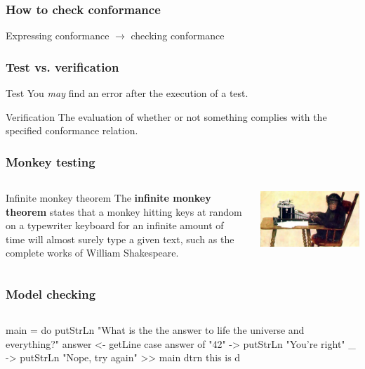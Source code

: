 \documentclass{beamer}
\begin{document}
\begin{frame}
\frametitle{How to check conformance}

\Large{Expressing conformance $\xrightarrow{\ }$ checking conformance}

\end{frame}

\begin{frame}
\frametitle{Test vs. verification}
\begin{block}{Test}
You \textit{may} find an error after the execution of a test.
\end{block}
\begin{block}{Verification}
The evaluation of whether or not something complies with the
specified conformance relation.
\end{block}
\end{frame}

\begin{frame}
\frametitle{Monkey testing}
    \begin{columns}[c] %
\begin{block}{Infinite monkey theorem}
The \textbf{infinite monkey theorem} states that a monkey hitting keys at random
on a typewriter keyboard for an infinite amount of time will almost surely type a
given text, such as the complete works of William Shakespeare.\cite{monkey}
\end{block}
    \includegraphics[width=\textwidth]{../img/monkey_approach} 
    \end{columns}
\end{frame}

\begin{frame}
\frametitle{Model checking}
    \begin{columns}[c] %
    main = do
    	putStrLn "What is the the answer to life the universe and everything?"
    	answer <- getLine
    	case answer of 
    	"42" -> putStrLn "You're right"
    		_	 -> putStrLn "Nope, try again" >> main 
    dtrn this is d
    \end{columns}
\end{frame}
\end{document}

